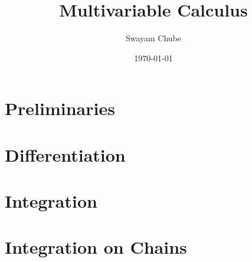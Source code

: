 \documentclass[12pt, oneside]{report}
\title{Multivariable Calculus}
\author{Swayam Chube}
\date{\today}
\theoremstyle{definition}
\begin{document}
    \maketitle 
    \tableofcontents
    \setcounter{chapter}{-1}
    \chapter{Preliminaries}
    
    \chapter{Differentiation}
    
    \chapter{Integration}
    
    \chapter{Integration on Chains}
    
\end{document}
